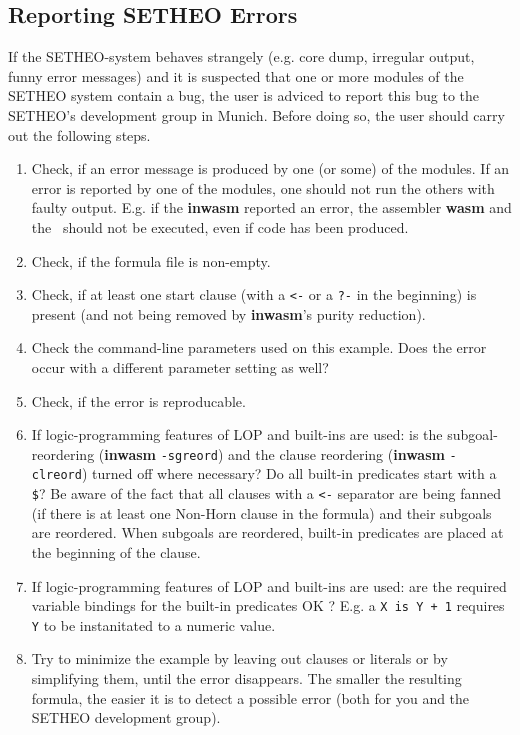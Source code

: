 %

\subsection{Reporting SETHEO Errors}
\label{subsec:reporting-errors}

If the SETHEO-system behaves strangely (e.g. core dump, irregular
output, funny error messages) and it is suspected that one or more
modules of the SETHEO system contain a bug, the user is
adviced to report this bug to the SETHEO's development group
in Munich.
Before doing so, the user should carry out the following steps.

\begin{enumerate}
\item
Check,
if an error message is produced by one (or some) of the modules.
If an error is reported by one of the modules, one should not run the
others with faulty output. E.g. if the {\bf inwasm} reported an error,
the assembler {\bf wasm} and the \SAM\ should not be executed, even if code
has been produced.
\item
Check,
if the formula file is non-empty.
\item
Check,
if at least one start clause (with a {\tt <-} or a {\tt ?-}
in the beginning)
is present (and not being removed by {\bf inwasm}'s purity reduction).
\item
Check the command-line parameters used on this example.
Does the error occur with a different parameter setting as well?
\item
Check, if the error is reproducable.
\item
If logic-programming features of LOP and built-ins are used:
is the subgoal-reordering ({\bf inwasm} {\tt -sgreord})
and the clause reordering ({\bf inwasm} {\tt -clreord})
turned off where necessary?
Do all built-in predicates start with a {\tt\$}?
Be aware of the fact that all clauses with a {\tt <-} separator
are being fanned (if there is at least one Non-Horn clause in the formula)
and their subgoals are reordered.
When subgoals are reordered, built-in predicates are placed
at the beginning of the clause.
\item
If logic-programming features of LOP and built-ins are used:
are the required variable bindings for the built-in predicates OK ?
E.g. a {\tt X is Y + 1} requires {\tt Y} to be instanitated to
a numeric value.
\item
Try to minimize the example by leaving out clauses or literals or
by simplifying them, until the error disappears.
The smaller the resulting formula, the easier it is to detect a possible
error (both for you and the SETHEO development group).
\end{enumerate}

